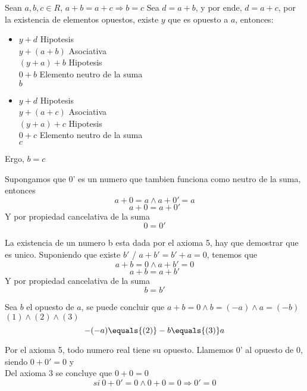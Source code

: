 \documentclass[10pt]{article}
\begin{document}
\begin{prf}{}
Sean $a,b,c \in R$, $a+b=a+c \Rightarrow b=c$
Sea $d=a+b$, y por ende, $d=a+c$, por la existencia de elementos opuestos, existe $y$ que es opuesto  a $a$, entonces:

\begin{itemize}
\item $y+d$ \dotfill Hipotesis\\
$y+(a+b)$ \dotfill Asociativa\\
$(y+a)+b$ \dotfill Hipotesis\\
$0+b$ \dotfill Elemento neutro de la suma\\
$b$\\
\item $y+d$ \dotfill Hipotesis\\
$y+(a+c)$ \dotfill Asociativa\\
$(y+a)+c$ \dotfill Hipotesis\\
$0+c$ \dotfill Elemento neutro de la suma\\
$c$\\
\end{itemize}
Ergo, $b=c$
\end{prf}

\begin{prf}{}
Supongamos que 0' es un numero que tambien funciona como neutro de la suma, entonces
$$a+0=a \land a+0'=a$$
$$a+0=a+0'$$
Y por propiedad cancelativa de la suma
$$0=0'$$
\end{prf}

\begin{prf}{}
La existencia de un numero b esta dada por el axioma 5, hay que demostrar que es unico. Suponiendo que existe $b'$ / $a+b'=b'+a=0$, tenemos que
$$a+b=0 \land a+b'=0$$
$$a+b = a+b'$$
Y por propiedad cancelativa de la suma
$$b=b'$$
\end{prf}

\begin{prf}{}
Sea $b$ el opuesto de $a$, se puede concluir que $a+b=0 \land b=(-a) \land a=(-b)$\hfill$(1)\land(2)\land(3)$
$$-(-a)\equals{(2)}-b\equals{(3)}a$$
\end{prf}

\begin{prf}{}
Por el axioma 5, todo numero real tiene su opuesto. Llamemos 0' al opuesto de 0, siendo $0+0'=0$ y\\
Del axioma 3 se concluye que $0+0=0$
$$si\ 0+0'=0 \land 0+0=0 \Rightarrow 0'=0$$
\end{prf}
\end{document}

